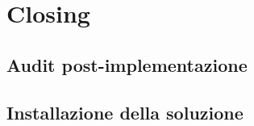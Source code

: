 \section{Closing}

\subsection{Audit post-implementazione}
\subsection{Installazione della soluzione}